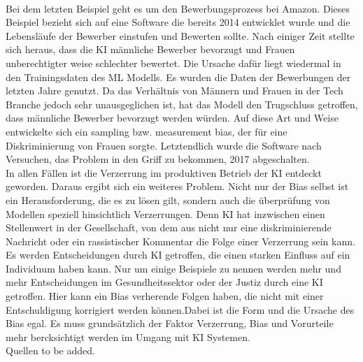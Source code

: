 \begin{onehalfspace}
        \\
        Bei dem letzten Beispiel geht es um den Bewerbungsprozess bei Amazon. Dieses Beispiel bezieht sich auf eine Software die bereits 2014 entwicklet wurde und die Lebensläufe der Bewerber einstufen und Bewerten sollte. Nach einiger Zeit stellte sich heraus, dass die \ac*{KI} männliche Bewerber bevorzugt und Frauen unberechtigter weise schlechter bewertet. Die Ursache dafür liegt wiedermal in den Trainingsdaten des \ac*{ML} Modells. Es wurden die Daten der Bewerbungen der letzten Jahre genutzt. Da das Verhältnis von Männern und Frauen in der Tech Branche jedoch sehr unausgeglichen ist, hat das Modell den Trugschluss getroffen, dass männliche Bewerber bevorzugt werden würden. Auf diese Art und Weise entwickelte sich ein sampling bzw. measurement bias, der für eine Diskriminierung von Frauen sorgte. Letztendlich wurde die Software nach Versuchen, das Problem in den Griff zu bekommen, 2017 abgeschalten.\cite{Cremers2019}\cite{IncidentDatabase2015_37}
        \\
        In allen Fällen ist die Verzerrung im produktiven Betrieb der \ac*{KI} entdeckt geworden. Daraus ergibt sich ein weiteres Problem. Nicht nur der Bias selbst ist ein Herausforderung, die es zu lösen gilt, sondern auch die überprüfung von Modellen speziell hinsichtlich Verzerrungen. Denn \ac*{KI} hat inzwischen einen Stellenwert in der Gesellschaft, von dem aus nicht nur eine diskriminierende Nachricht oder ein rassistischer Kommentar die Folge einer Verzerrung sein kann. Es werden Entscheidungen durch \ac*{KI} getroffen, die einen starken Einfluss auf ein Individuum haben kann. Nur um einige Beispiele zu nennen werden mehr und mehr Entscheidungen im Gesundheitssektor oder der Justiz durch eine \ac*{KI} getroffen. Hier kann ein Bias verherende Folgen haben, die nicht mit einer Entschuldigung korrigiert werden können.\cite{hagendorff2019maschinelles}Dabei ist die Form und die Ursache des Bias egal. Es muss grundsätzlich der Faktor Verzerrung, Bias und Vorurteile mehr bercksichtigt werden im Umgang mit \ac*{KI} Systemen.\cite{Drew2019}
        \\
        Quellen to be added.
        \cite{hagendorff2019maschinelles}
    

\end{onehalfspace}
